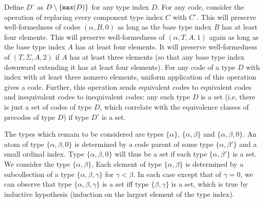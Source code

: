 \documentclass{article}
\begin{document}
\begin{description}
Define $D^{\circ}$ as $D \setminus \{{\tt max}(D)\}$ for any type index $D$.   For any code, consider the operation of replacing every component type index $C$ with
$C^{\circ}$.  This will preserve well-formedness of codes $(\alpha,B,0)$ as long as the base type index $B$ has at least four elements.   This will preserve well-formedness
of $(\alpha,T,A,1)$ again as long as the base type index $A$ has at least four elements.  It will preserve well-formedness of $(T,\Sigma,A,2)$ if $A$ has at least three elements (so that any base type index downward extending it has at least four elements).  For any code of a type $D$ with index with at least three nonzero elements, uniform application of this operation gives a code.   Further, this operation sends equivalent codes to equivalent codes and inequivalent codes to inequivalent codes:  any such type $D$ is a set (i.e, there is just a set of codes of type $D$, which correlate with the equivalence classes of precodes of type $D$) if type $D^{\circ}$ is a set.

The types which remain to be considered are types $\{\alpha\}$, $\{\alpha,\beta\}$ and $\{\alpha,\beta,0\}$.   An atom of type $\{\alpha,\beta,0\}$ is determined by a code parent of some type $\{\alpha,\beta'\}$ and a small ordinal index.  Type $\{\alpha,\beta,0\}$ will thus be a set if each type $\{\alpha,\beta'\}$ is a set.  We consider the type $\{\alpha,\beta\}$,
Each element of type $\{\alpha,\beta\}$ is determined by a subcollection of a type $\{\alpha,\beta,\gamma\}$ for $\gamma<\beta$.  In each case except that of
$\gamma=0$, we can observe that type $\{\alpha,\beta,\gamma\}$ is a set iff type $\{\beta,\gamma\}$ is a set, which is true by inductive hypothesis (induction on the largest element of the type index).


\end{description}
\end{document}
